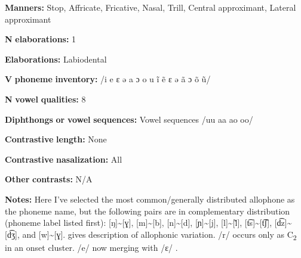 \documentclass[output=paper]{langsci/langscibook}
\begin{document}
\begin{styleBody}
\textbf{Manners:} Stop, Affricate, Fricative, Nasal, Trill, Central approximant, Lateral approximant
\end{styleBody}

\begin{styleBody}
\textbf{N} \textbf{elaborations:} 1
\end{styleBody}

\begin{styleBody}
\textbf{Elaborations:} Labiodental
\end{styleBody}

\begin{styleBody}
\textbf{V} \textbf{phoneme} \textbf{inventory:} /i e ɛ ə a ɔ o u ĩ ẽ ɛ ə ã ɔ õ ũ/
\end{styleBody}

\begin{styleBody}
\textbf{N} \textbf{vowel} \textbf{qualities:} 8
\end{styleBody}

\begin{styleBody}
\textbf{Diphthongs} \textbf{or} \textbf{vowel} \textbf{sequences:} Vowel sequences /uu aa ao oo/
\end{styleBody}

\begin{styleBody}
\textbf{Contrastive} \textbf{length:} None
\end{styleBody}

\begin{styleBody}
\textbf{Contrastive} \textbf{nasalization:} All
\end{styleBody}

\begin{styleBody}
\textbf{Other} \textbf{contrasts:} N/A
\end{styleBody}

\begin{styleBody}
\textbf{Notes:} Here I’ve selected the most common/generally distributed allophone as the phoneme name, but the following pairs are in complementary distribution (phoneme label listed first): [ŋ]{\textasciitilde}[ɣ], [m]{\textasciitilde}[b], [n]{\textasciitilde}[d], [ɲ]{\textasciitilde}[j], [l]{\textasciitilde}[\~{l}], [t͡s]{\textasciitilde}[t͡ʃ], [d͡z]{\textasciitilde}[d͡ʒ], and [w]{\textasciitilde}[ɣ]. \citet[10-18]{Duthie1996} gives description of allophonic variation. /r/ occurs only as C\textsubscript{2} in an onset cluster. /e/ now merging with /ɛ/ \citep[19]{Duthie1996}.
\end{styleBody}
\end{document}
